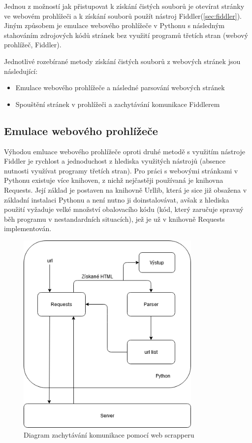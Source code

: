 \documentclass[thesis=M,czech,hidelinks]{FITthesis}[2013/05/06]
\begin{document}
Jednou z možností jak přistupovat k získání čistých souborů je otevírat stránky ve webovém prohlížeči a k získání souborů použít nástroj Fiddler(\ref{sec:fiddler}). Jiným způsobem je emulace webového prohlížeče v Pythonu s následným stahováním zdrojových kódů stránek bez využití programů třetích stran (webový prohlížeč, Fiddler).

Jednotlivé rozebírané metody získání čistých souborů z webových stránek jsou následující:
\begin{itemize}
	\item Emulace webového prohlížeče a následné parsování webových stránek 
	\item Spouštění stránek v prohlížeči a zachytávání komunikace Fiddlerem
\end{itemize}

\subsection{Emulace webového prohlížeče} \label{sec:parsing}
Výhodou emluace webového prohlížeče oproti druhé metodě s využitím nástroje Fiddler je rychlost a jednoduchost z hlediska využitých nástrojů (absence nutnosti využívat programy třetích stran). Pro práci s webovými stránkami v Pythonu existuje více knihoven, z nichž nejčastěji používaná je knihovna Requests. Její základ je postaven na knihovně Urllib, která je sice již obsažena v základní instalaci Pythonu a není nutno ji doinstalovávat, avšak z hlediska použití vyžaduje velké množství obalovacího kódu (kód, který zaručuje spravný běh programu v nestandardních situacích), jež je už v knihovně  Requests implementován.
\begin{figure}[h]
	\centering
	\includegraphics[width=9cm]{pictures/scrapper.png}
	\caption{Diagram zachytávání komunikace pomocí web scrapperu}
	\label{fig:web_scrapper}
\end{figure}
\end{document}
